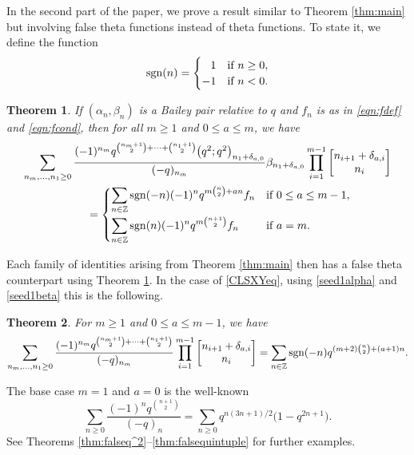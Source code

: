 \documentclass[pdftex]{sigma}
\newtheorem{Theorem}{Theorem}[section]
\numberwithin{equation}{section}
\newcommand{\ZZ}{\mathbb{Z}}
\begin{document}
In the second part of the paper, we prove a result similar to Theorem \ref{thm:main} but involving false theta functions instead of theta functions. To state it, we define the function
\begin{equation*}
	{\rm sgn}(n) =
	\begin{cases}
		\hphantom{-}1 &\text{if $n \geq 0$}, \\
		-1 &\text{if $n < 0$}.
	\end{cases}
\end{equation*}

\begin{Theorem}
	\label{thm:false}
	If $(\alpha_n,\beta_n)$ is a Bailey pair relative to $q$ and $f_n$ is as in \eqref{eqn:fdef} and \eqref{eqn:fcond}, then for all $m\geq 1$ and $0\leq a \leq m$, we have
	\begin{gather}
			\sum_{n_m, \dots, n_1 \geq 0} \frac{(-1)^{n_m}q^{\binom{n_m+1}{2} + \cdots + \binom{n_1+1}{2}}\bigl(q^2;q^2\bigr)_{n_1+\delta_{a,0}}}{(-q)_{n_m}} \beta_{n_1+\delta_{a,0}} \prod_{i=1}^{m-1} \begin{bmatrix} n_{i+1} + \delta_{a,i} \\ n_i \end{bmatrix}
			\nonumber\\
			\qquad{}=
			\begin{cases}
				\displaystyle\sum_{n\in\ZZ}
				{\rm sgn}(-n)(-1)^nq^{m\binom{n}{2}+an}f_n & \text{if $0 \leq a \leq m-1$}, \vspace{1mm}\\
				\displaystyle\sum_{n \in \mathbb{Z}} {\rm sgn}(n)(-1)^n q^{m\binom{n+1}{2}}f_n & \text{if $a=m$}.
			\end{cases}\label{eqn:falseid}
	\end{gather}
\end{Theorem}
Each family of identities arising from Theorem \ref{thm:main} then has a false theta counterpart using Theorem \ref{thm:false}. In the case of \eqref{CLSXYeq}, using \eqref{seed1alpha} and \eqref{seed1beta} this is the following.
\begin{Theorem}\label{thm:falseCLSXY}
	For $m \geq 1$ and $0 \leq a \leq m-1$, we have
	\begin{gather*}
			\sum_{n_m, \dots, n_1 \geq 0} \frac{(-1)^{n_m}q^{\binom{n_m + 1}{2} + \cdots + \binom{n_1+1}{2}}}{(-q)_{n_m}} \prod_{i=1}^{m-1} \begin{bmatrix} n_{i+1} + \delta_{a,i} \\ n_i \end{bmatrix}
		 = \sum_{n \in \mathbb{Z}} {\rm sgn}(-n)q^{(m+2)\binom{n}{2} + (a+1)n}.
 \end{gather*}
\end{Theorem}
The base case $m=1$ and $a=0$ is the well-known
\begin{equation*}
	\sum_{n \geq 0} \frac{(-1)^nq^{\binom{n+1}{2}}}{(-q)_n} = \sum_{n \geq 0} q^{n(3n+1)/2}\bigl(1-q^{2n+1}\bigr).
\end{equation*}	
See Theorems \ref{thm:falseq^2}--\ref{thm:falsequintuple} for further examples.
\end{document}

